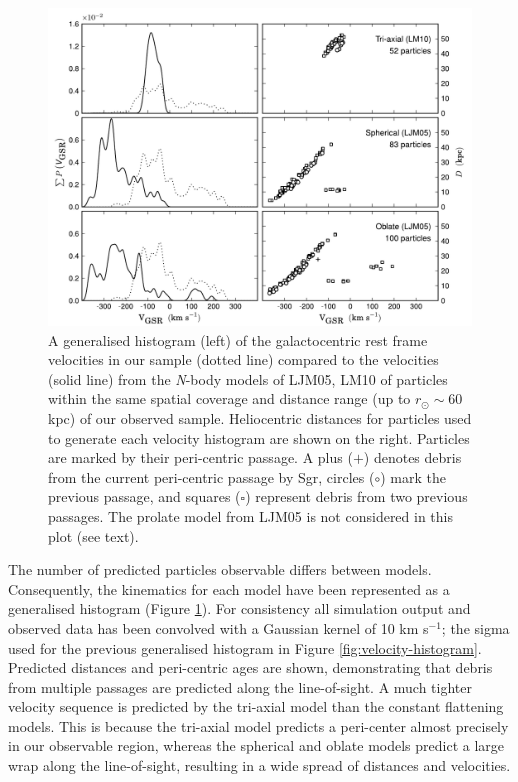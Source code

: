 	\begin{figure}[t!]
		\includegraphics[width=\textwidth]{chapter1/sgr_velocities.pdf}
		\caption{A generalised histogram (left) of the galactocentric rest frame velocities in our sample (dotted line) compared to the velocities (solid line) from the \textit{N}-body models of LJM05, LM10 of particles within the same spatial coverage and distance range (up to $r_\odot \sim 60$ kpc) of our observed sample. Heliocentric distances for particles used to generate each velocity histogram are shown on the right. Particles are marked by their peri-centric passage. A plus ($+$) denotes debris from the current peri-centric passage by Sgr, circles ($\circ$) mark the previous passage, and squares ($\square$) represent debris from two previous passages. The prolate model from LJM05 is not considered in this plot (see text).}
		\label{fig:law-vel-compare}
	\end{figure}
	
	The number of predicted particles observable differs between models. Consequently, the kinematics for each model have been represented as a generalised histogram (Figure \ref{fig:law-vel-compare}). For consistency all simulation output and observed data has been convolved with a Gaussian kernel of 10 km s$^{-1}$; the sigma used for the previous generalised histogram in Figure \ref{fig:velocity-histogram}. Predicted distances and peri-centric ages are shown, demonstrating that debris from multiple passages are predicted along the line-of-sight. A much tighter velocity sequence is predicted by the tri-axial model than the constant flattening models. This is because the tri-axial model predicts a peri-center almost precisely in our observable region, whereas the spherical and oblate models predict a large wrap along the line-of-sight, resulting in a wide spread of distances and velocities.
	
